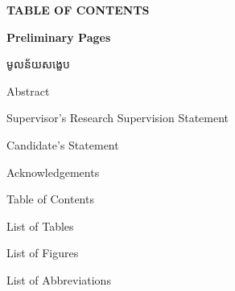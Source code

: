 \begin{adjustwidth}{0.2cm}{0.2cm}

    \begin{center}
        {\englishfont\fontsize{14pt}{21pt}\selectfont \textbf{TABLE OF CONTENTS} \par}
    \end{center}
    \label{toc}

    \vspace{1cm}

    \setlength{\parindent}{0pt}
    {\large \textbf{Preliminary Pages}\par}
    \vspace{0.3cm}
    {\khmernormal\fontsize{11pt}{16pt}\selectfont មូលន័យសង្ខេប\dotfill\hyperref[khmer-abstract]{{\pageref{khmer-abstract}}}\hspace{0.1cm}\par}
    {\large Abstract\dotfill\hyperref[abstract]{{\pageref{abstract}}}\hspace{0.1cm}\par}
    {\large Supervisor's Research Supervision Statement\dotfill\hyperref[supervisor-statement]{{\pageref{supervisor-statement}}}\hspace{0.1cm}\par}
    {\large Candidate's Statement\dotfill\hyperref[candidate-statement]{{\pageref{candidate-statement}}}\hspace{0.1cm}\par}
    {\large Acknowledgements\dotfill\hyperref[acknowledgements]{{\pageref{acknowledgements}}}\hspace{0.1cm}\par}
    {\large Table of Contents\dotfill\hyperref[toc]{{\pageref{toc}}}\hspace{0.1cm}\par}
    {\large List of Tables\dotfill\hyperref[lot]{{\pageref{lot}}}\hspace{0.1cm}\par}
    {\large List of Figures\dotfill\hyperref[lof]{{\pageref{lof}}}\hspace{0.1cm}\par}
    {\large List of Abbreviations\dotfill\hyperref[loa]{{\pageref{loa}}}\hspace{0.1cm}\par}


\end{adjustwidth}
